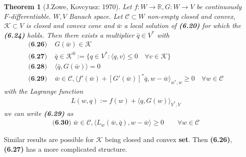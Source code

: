 \documentclass[a4paper,11pt,fleqn]{book}
\newtheorem{theorem}{Theorem}[section]
\theoremstyle{definition}
\theoremstyle{remark}
\begin{document}
\begin{theorem}[J.Zowe, Kovcyusz: 1970]
	Let $f: W \rightarrow \mathbb{R}, G: W \rightarrow V$ be continuously $F$-differentiable. $W, V$ Banach space. Let $\mathcal{C} \subset W$ non-empty closed and convex, $\mathcal{K} \subset V$ is closed and convex cone and $\bar{w}$ a local solution of \textbf{(6.20)} for which the \textbf{(6.24)} holds. Then there exists a multiplier $\bar{q} \in V^*$ with 
	\begin{align*}
		\textbf{(6.26) } &G(\bar{w}) \in \mathcal{K}\\
		\textbf{(6.27) } &\bar{q} \in \mathcal{K}^0:= \{q \in V^*: \langle q, v \rangle \le 0 \quad \forall v \in \mathcal{K} \}\\
		\textbf{(6.28) } &\langle \bar{q}, G(\bar{w}) \rangle = 0\\
		\textbf{(6.29) } &\bar{w} \in \mathcal{C}, \langle f'(\bar{w}) + [G'(\bar{w})]^* \bar{q}, w - \bar{w} \rangle_{w^*, w} \geq 0 \quad \forall w \in \mathcal{C}
	\end{align*}
	with the Lagrange function
	\begin{align*}
		L(w, q):= f(w) + \langle q, G(w) \rangle_{V^*, V}
	\end{align*}
	we can write \textbf{(6.29)} as 
	\begin{align*}
		\textbf{(6.30) }
		\bar{w} \in \mathcal{C}, \langle L_w(\bar{w}, \bar{q}), w - \bar{w} \rangle \ge 0\qquad \forall w \in \mathcal{C}
	\end{align*}
\end{theorem}

Similar results are possible for $\mathcal{K}$ being closed and convex \textbf{set}. Then \textbf{(6.26)}, \textbf{(6.27)} has a more complicated structure. 
\end{document}
